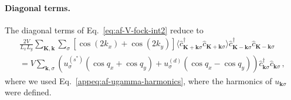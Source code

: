 \paragraph{Diagonal terms.}

The diagonal terms of Eq.~\eqref{eq:af-V-fock-int2} reduce to
\begin{multline}
	\frac{2V}{L_x L_y} \sum_{\mathbf{K}, \mathbf{k}} \sum_\sigma \left[
	\cos \left(
	2k_x
	\right)	+ \cos \left(
	2k_y
	\right)
	\right] \langle
	\hat c_{\mathbf{K}+\mathbf{k} \sigma}^\dagger
	\hat c_{\mathbf{K}+\mathbf{k} \sigma}
	\rangle
	\hat c_{\mathbf{K}-\mathbf{k} \sigma}^\dagger  \hat c_{\mathbf{K}-\mathbf{k}\sigma} \\
	= V \sum_{\mathbf{k},\sigma} \left(
	u^{(s^*)}_\sigma (\cos q_x + \cos q_y) + u^{(d)}_\sigma (\cos q_x - \cos q_y)
	\right) \hat c_{\mathbf{k} \sigma}^\dagger
	\hat c_{\mathbf{k}\sigma} \, , \label{eq:af-V-fock-int3-diag}
\end{multline}
where we used Eq.~\eqref{appeq:af-ugamma-harmonics}, where the harmonics of $u_{\mathbf{k}\sigma}$ were defined.

